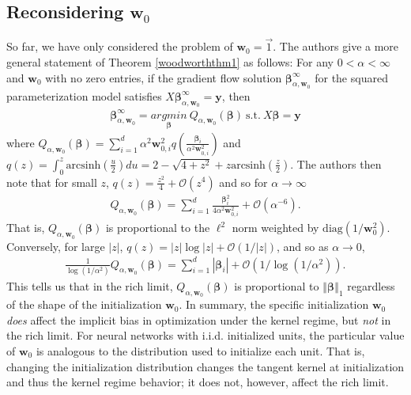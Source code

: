 \documentclass{article}
\newenvironment{manualtheorem}[1]{%
  \renewcommand\themanualtheoreminner{#1}%
  \manualtheoreminner
}{\endmanualtheoreminner}
\begin{document}
\subsection{Reconsidering $\boldsymbol{w}_0$}
So far, we have only considered the problem of $\boldsymbol{w}_0 = \vec{1}$. The authors give a more general statement of Theorem \ref{woodworththm1} as follows:
\begin{manualtheorem}{1}\label{woodworththm1_1}
For any $0 < \alpha < \infty$ and $\boldsymbol{w}_0$ with no zero entries, if the gradient flow solution $\boldsymbol{\beta}_{\alpha, \boldsymbol{w}_0}^{\infty}$ for the squared parameterization model satisfies $X\boldsymbol{\beta}_{\alpha, \boldsymbol{w}_0}^{\infty} = \boldsymbol{y}$, then 
\begin{align*}
    \boldsymbol{\beta}_{\alpha, \boldsymbol{w}_0}^{\infty} = \underset{\boldsymbol{\beta}}{argmin} \ Q_{\alpha, \boldsymbol{w}_0}(\boldsymbol{\beta}) \ \text{s.t.} \ X\boldsymbol{\beta} = \boldsymbol{y}
\end{align*}
where $Q_{\alpha, \boldsymbol{w}_0}(\boldsymbol{\beta}) = \sum_{i=1}^d \alpha^2 \boldsymbol{w}_{0,i}^2 q\left(\frac{\boldsymbol{\beta}_i}{\alpha^2\boldsymbol{w}_{0,i}^2}\right)$ and $q(z) = \int_0^z \text{arcsinh}\left(\frac{u}{2} \right) du = 2 - \sqrt{4+z^2} + z \text{arcsinh}\left(\frac{z}{2} \right).$
\end{manualtheorem}
The authors then note that for small $z$, $q(z) = \frac{z^2}{4} + \mathcal{O}(z^4)$ and so for $\alpha \rightarrow \infty$
\begin{align*}
    Q_{\alpha, \boldsymbol{w}_0}(\boldsymbol{\beta}) = \sum_{i=1}^d \frac{\boldsymbol{\beta}_i^2}{4\alpha^2\boldsymbol{w}_{0, i}^2} + \mathcal{O}(\alpha^{-6}).
\end{align*}
That is, $Q_{\alpha, \boldsymbol{w}_0}(\boldsymbol{\beta})$ is proportional to the $\ell^2$ norm weighted by $\text{diag}(1/\boldsymbol{w}_0^2)$. Conversely, for large $\left| z \right|$, $q(z) = \left|z \right| \log \left|z \right| + \mathcal{O}(1/ \left| z \right|)$, and so as $\alpha \rightarrow 0$, 
\begin{align*}
    \frac{1}{\log(1/\alpha^2)}Q_{\alpha, \boldsymbol{w}_0}(\boldsymbol{\beta}) = \sum_{i=1}^d \left| \boldsymbol{\beta}_i \right| + \mathcal{O}(1/\log(1/\alpha^2)).
\end{align*}
This tells us that in the rich limit, $Q_{\alpha, \boldsymbol{w}_0}(\boldsymbol{\beta})$ is proportional to $\left\Vert \boldsymbol{\beta} \right\Vert_1 $ regardless of the shape of the initialization $\boldsymbol{w}_0$. In summary, the specific initialization $\boldsymbol{w}_0$ \textit{does} affect the implicit bias in optimization under the kernel regime, but \textit{not} in the rich limit. For neural networks with i.i.d. initialized units, the particular value of $\boldsymbol{w}_0$ is analogous to the distribution used to initialize each unit. That is, changing the initialization distribution changes the tangent kernel at initialization and thus the kernel regime behavior; it does not, however, affect the rich limit.
\end{document}
